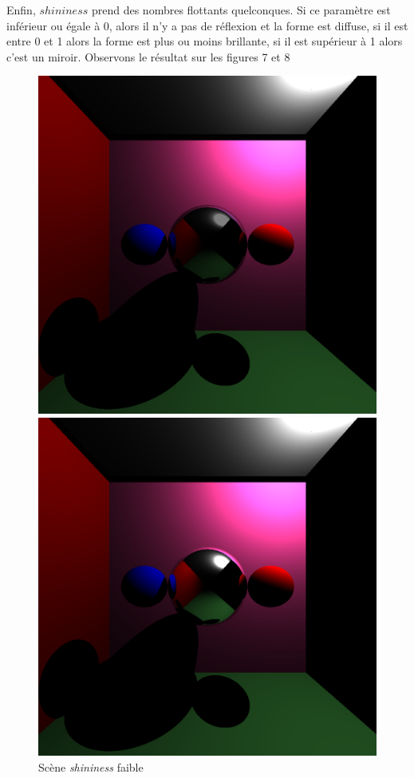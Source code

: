 \documentclass[11pt, oneside]{article}   	%
\begin{document}
Enfin, $shininess$ prend des nombres flottants quelconques. Si ce paramètre est inférieur ou égale à 0, alors il n'y a pas de réflexion et la forme est diffuse, si il est entre 0 et 1 alors la forme est plus ou moins brillante, si il est supérieur à 1 alors c'est un miroir. Observons le résultat sur les figures 7 et 8

\begin{figure}[!tbp]
  \centering
  \begin{minipage}[b]{0.4\textwidth}
    \includegraphics[width=\textwidth]{rapport/result 7.png}
    \caption{Scène \textit{shininess} faible}
  \end{minipage}
  \hfill
  \begin{minipage}[b]{0.4\textwidth}
    \includegraphics[width=\textwidth]{rapport/result 8.png}

\end{minipage}
\end{figure}
\end{document}
